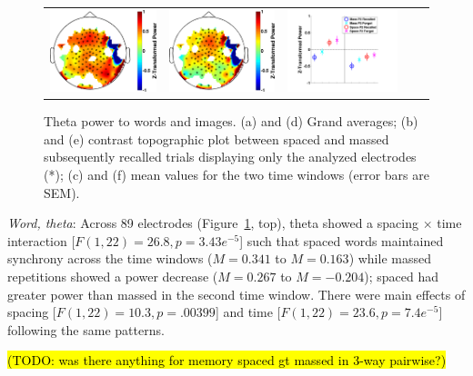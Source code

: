 \begin{figure}[H]
\begin{tabular}{ccccc}
  \includegraphics[width=.19\textwidth]{./figs/exp1/tfr_topocont_ga_img_RgH_rc_spac_p2vsimg_RgH_rc_mass_p2_99ROIs_4_8_0_500_-1p0_1p0_cb} &
  \includegraphics[width=.19\textwidth]{./figs/exp1/tfr_topocont_ga_img_RgH_rc_spac_p2vsimg_RgH_rc_mass_p2_99ROIs_4_8_520_1000_-1p0_1p0_cb} &
  \includegraphics[width=.30\textwidth]{./figs/exp1/tfr_avg_ga_img_RgH_rc_mass_p2_img_RgH_fo_mass_p2_img_RgH_rc_spac_p2_img_RgH_fo_spac_p2_99ROI_0_500_500_1000_4_8_ylabel} \\
  \end{tabular}
  \caption{Theta power to words and images.  (a) and (d) Grand averages; (b) and (e) contrast topographic plot between spaced and massed subsequently recalled trials displaying only the analyzed electrodes (*); (c) and (f) mean values for the two time windows (error bars are SEM).}
  \label{fig:word_img_theta}
\end{figure}

\textit{Word, theta}: Across 89 electrodes (Figure~\ref{fig:word_img_theta}, top), theta showed a spacing $\times$ time interaction [$F(1,22)=26.8, p=3.43e^{-5}$] such that spaced words maintained synchrony across the time windows ($M=0.341$ to $M=0.163$) while massed repetitions showed a power decrease ($M=0.267$ to $M=-0.204$); spaced had greater power than massed in the second time window.
There were main effects of spacing [$F(1,22)=10.3, p=.00399$] and time [$F(1,22)=23.6, p=7.4e^{-5}$] following the same patterns.

\hl{(TODO: was there anything for memory spaced gt massed in 3-way pairwise?)}

